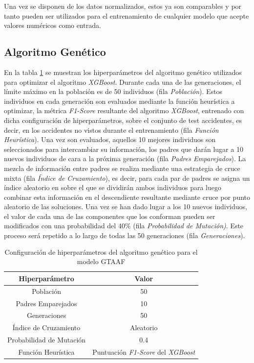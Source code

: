 Una vez se disponen de los datos normalizados, estos ya son comparables y por tanto pueden ser utilizados para el entrenamiento de cualquier modelo que acepte valores numéricos como entrada.


\subsection{Algoritmo Genético}


En la tabla \ref{GAHyperparametersSetup} se muestran los hiperparámetros del algoritmo genético utilizados para optimizar el algoritmo \textit{XGBoost}. Durante cada una de las generaciones, el límite máximo en la población es de 50 individuos (fila \textit{Población}). Estos individuos en cada generación son evaluados mediante la función heurística a optimizar, la métrica \textit{F1-Score} resultante del algoritmo \textit{XGBoost}, entrenado con dicha configuración de hiperparámetros, sobre el conjunto de test accidentes, es decir, en los accidentes no vistos durante el entrenamiento (fila \textit{Función Heurística}). Una vez son evaluados, aquellos 10 mejores individuos son seleccionados para intercambiar su información, los padres que darán lugar a 10 nuevos individuos de cara a la próxima generación (fila \textit{Padres Emparejados}). La mezcla de información entre padres se realiza mediante una estrategia de cruce mixta (fila \textit{Índice de Cruzamiento}), es decir, para cada par de padres se asigna un índice aleatorio en sobre el que se dividirán ambos individuos para luego combinar esta información en el descendiente resultante mediante cruce por punto aleatorio de las soluciones. Una vez se han dado lugar a los 10 nuevos individuos, el valor de cada una de las componentes que los conforman pueden ser modificados con una probabilidad del 40\% (fila \textit{Probabilidad de Mutación)}. Este proceso será repetido a lo largo de todas las 50 generaciones (fila \textit{Generaciones}).


\begin{table}[H]
	\centering
	\begin{tabular}{|c|c|}
		\hline
		\textbf{Hiperparámetro} & \textbf{Valor} \\ \hline
		\hline
		Población     & 50 \\ \hline
		Padres Emparejados & 10 \\ \hline
		Generaciones    & 50 \\ \hline
		Índice de Cruzamiento & Aleatorio \\ \hline
		Probabilidad de Mutación & 0.4 \\ \hline
		Función Heurística & Puntuación \textit{F1-Score} del \textit{XGBoost} \\ \hline \hline
	\end{tabular}
	\caption{Configuración de hiperparámetros del algoritmo genético para el modelo GTAAF}
	\label{GAHyperparametersSetup}
\end{table}

